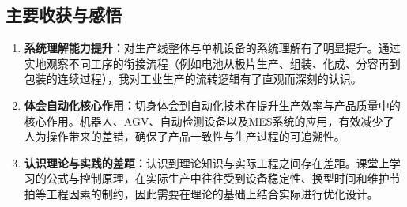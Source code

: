 \subsection{主要收获与感悟}
\begin{enumerate}[label=\arabic*.]
    \item \textbf{系统理解能力提升：}对生产线整体与单机设备的系统理解有了明显提升。通过实地观察不同工序的衔接流程（例如电池从极片生产、组装、化成、分容再到包装的连续过程），我对工业生产的流转逻辑有了直观而深刻的认识。
    \item \textbf{体会自动化核心作用：}切身体会到自动化技术在提升生产效率与产品质量中的核心作用。机器人、AGV、自动检测设备以及MES系统的应用，有效减少了人为操作带来的差错，确保了产品一致性与生产过程的可追溯性。
    \item \textbf{认识理论与实践的差距：}认识到理论知识与实际工程之间存在差距。课堂上学习的公式与控制原理，在实际生产中往往受到设备稳定性、换型时间和维护节拍等工程因素的制约，因此需要在理论的基础上结合实际进行优化设计。
\end{enumerate}

